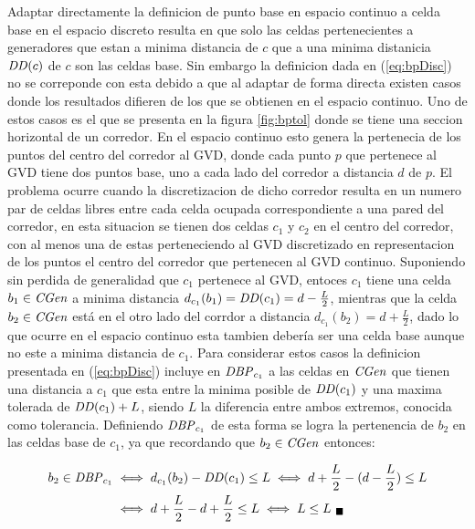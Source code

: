 Adaptar directamente la definicion de punto base en espacio continuo a celda
base en el espacio discreto resulta en que solo las celdas pertenecientes a
generadores que estan a minima distancia de $c$ que a una minima distanicia
$\mathit{DD}(c)$ de $c$ son las celdas base. Sin embargo la definicion dada en
(\ref{eq:bpDisc}) no se correponde con esta debido a que al adaptar de forma
directa existen casos donde los resultados difieren de los que se obtienen en
el espacio continuo. 
Uno de estos casos es el que se presenta en la figura \ref{fig:bptol} donde se
tiene una seccion horizontal de un corredor. En el espacio continuo esto genera
la pertenecia de los puntos del centro del corredor al GVD, donde cada punto
$p$ que pertenece al GVD tiene dos puntos base, uno a cada lado del corredor a
distancia $d$ de $p$. 
El problema ocurre cuando la discretizacion de dicho corredor resulta en un
numero par de celdas libres entre cada celda ocupada correspondiente a una
pared del corredor, en esta situacion se tienen dos celdas $c_1$ y $c_2$ en el
centro del corredor, con al menos una de estas perteneciendo al GVD discretizado en
representacion de los puntos el centro del corredor que pertenecen al GVD continuo.
Suponiendo sin perdida de generalidad que $c_1$ pertenece al GVD, entoces $c_1$
tiene una celda $b_1 \in \mathit{CGen}$ a minima distancia $d_{c_1}(b_1) = \mathit{DD}(c_1) =
d-\frac{L}{2}$, mientras que la celda $b_2 \in \mathit{CGen}$ está en el otro lado del
corrdor a distancia $d_{c_1}(b_2) = d+\frac{L}{2}$, dado lo que ocurre en el
espacio continuo esta tambien debería ser una celda base aunque no este a
minima distancia de $c_1$. Para considerar estos casos la definicion presentada
en (\ref{eq:bpDisc}) incluye en $\mathit{DBP}_{c_1}$ a las celdas en $\mathit{CGen}$ que
tienen una distancia a $c_1$ que esta entre la minima posible de $\mathit{DD}(c_1)$ y
una maxima tolerada de $\mathit{DD}(c_1)+L$, siendo $L$ la diferencia entre ambos
extremos, conocida como tolerancia. Definiendo $\mathit{DBP}_{c_1}$ de esta forma se logra la pertenencia de
$b_2$ en las celdas base de $c_1$, ya que recordando que $b_2\in \mathit{CGen}$ entonces:

\begin{align*}
\begin{split}
  b_2 \in \mathit{DBP}_{c_1} & \iff  d_{c_1}(b_2) - \mathit{DD}(c_1) \leq L \iff d+\frac{L}{2} - (d-\frac{L}{2}) \leq L\\
                          & \iff   d+\frac{L}{2} -d +\frac{L}{2} \leq L \iff L \leq L_{\ \blacksquare}
\end{split}
\end{align*}

